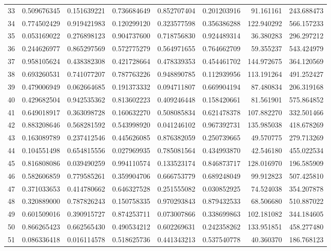 \begin{longtable}{rrrrrrrr}
33 & 0.509676345 & 0.151639221 & 0.736684649 & 0.852707404 & 0.201203916 & 91.161161 & 243.688473 \\
34 & 0.774502429 & 0.919421983 & 0.120299120 & 0.323577598 & 0.356386288 & 122.940292 & 566.157233 \\
35 & 0.053169022 & 0.276898123 & 0.904737600 & 0.718756830 & 0.924489314 & 36.380283 & 296.297212 \\
36 & 0.244626977 & 0.865297569 & 0.572775279 & 0.564971655 & 0.764662709 & 59.355237 & 543.424979 \\
37 & 0.958105624 & 0.438382308 & 0.421728664 & 0.478339353 & 0.454461702 & 144.972675 & 364.120569 \\
38 & 0.693260531 & 0.741077207 & 0.787763226 & 0.948890785 & 0.112939956 & 113.191264 & 491.252427 \\
39 & 0.479006949 & 0.062664685 & 0.191373332 & 0.094711807 & 0.669904194 & 87.480834 & 206.319168 \\
40 & 0.429682504 & 0.942535362 & 0.813602223 & 0.409246448 & 0.158420661 & 81.561901 & 575.864852 \\
41 & 0.649018917 & 0.363098728 & 0.160632270 & 0.508085834 & 0.621478378 & 107.882270 & 332.501466 \\
42 & 0.883208646 & 0.568281592 & 0.543998920 & 0.041246102 & 0.967392731 & 135.985038 & 418.678269 \\
43 & 0.163089789 & 0.237412546 & 0.445626085 & 0.876382059 & 0.250739665 & 49.570775 & 279.713269 \\
44 & 0.104551498 & 0.654815556 & 0.027969935 & 0.785081564 & 0.434993870 & 42.546180 & 455.022534 \\
45 & 0.816808086 & 0.039490259 & 0.994110574 & 0.133523174 & 0.846873717 & 128.016970 & 196.585909 \\
46 & 0.582606859 & 0.779585261 & 0.359904706 & 0.666753779 & 0.689248049 & 99.912823 & 507.425810 \\
47 & 0.371033653 & 0.414780662 & 0.646327528 & 0.251555082 & 0.030852925 & 74.524038 & 354.207878 \\
48 & 0.320889000 & 0.787826243 & 0.150758335 & 0.970293843 & 0.879432533 & 68.506680 & 510.887022 \\
49 & 0.601509016 & 0.390915727 & 0.874253711 & 0.073007866 & 0.338699863 & 102.181082 & 344.184605 \\
50 & 0.866265423 & 0.662565430 & 0.490534212 & 0.602269631 & 0.242358262 & 133.951851 & 458.277480 \\
51 & 0.086336418 & 0.016114578 & 0.518625736 & 0.441343213 & 0.537540778 & 40.360370 & 186.768123 \\

\end{longtable}
